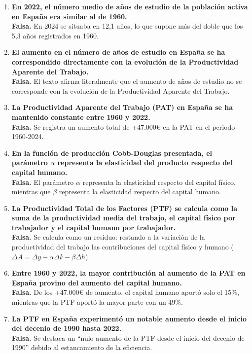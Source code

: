 \begin{enumerate}[label=\arabic*., resume=preguntas]
    \item \textbf{En 2022, el número medio de años de estudio de la población activa en España era similar al de 1960.} \\
    \textbf{Falsa.} En 2024 se situaba en 12,1 años, lo que supone más del doble que los 5,3 años registrados en 1960.

    \item \textbf{El aumento en el número de años de estudio en España se ha correspondido directamente con la evolución de la Productividad Aparente del Trabajo.} \\
    \textbf{Falsa.} El texto afirma literalmente que el aumento de años de estudio no se corresponde con la evolución de la Productividad Aparente del Trabajo.

    \item \textbf{La Productividad Aparente del Trabajo (PAT) en España se ha mantenido constante entre 1960 y 2022.} \\
    \textbf{Falsa.} Se registra un aumento total de +47.000€ en la PAT en el periodo 1960-2024.

    \item \textbf{En la función de producción Cobb-Douglas presentada, el parámetro $\alpha$ representa la elasticidad del producto respecto del capital humano.} \\
    \textbf{Falsa.} El parámetro $\alpha$ representa la elasticidad respecto del capital físico, mientras que $\beta$ representa la elasticidad respecto del capital humano.

    \item \textbf{La Productividad Total de los Factores (PTF) se calcula como la suma de la productividad media del trabajo, el capital físico por trabajador y el capital humano por trabajador.} \\
    \textbf{Falsa.} Se calcula como un residuo: restando a la variación de la productividad del trabajo las contribuciones del capital físico y humano ($\Delta A = \Delta y - \alpha\Delta k - \beta\Delta h$).

    \item \textbf{Entre 1960 y 2022, la mayor contribución al aumento de la PAT en España provino del aumento del capital humano.} \\
    \textbf{Falsa.} De los +47.000€ de aumento, el capital humano aportó solo el 15\%, mientras que la PTF aportó la mayor parte con un 49\%.

    \item \textbf{La PTF en España experimentó un notable aumento desde el inicio del decenio de 1990 hasta 2022.} \\
    \textbf{Falsa.} Se destaca un ``nulo aumento de la PTF desde el inicio del decenio de 1990'' debido al estancamiento de la eficiencia.


\end{enumerate}
